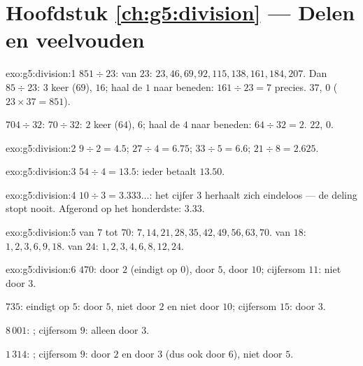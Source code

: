 \section*{Hoofdstuk \ref{ch:g5:division} --- Delen en veelvouden}

\begin{solution}{exo:g5:division:1}
$851 \div 23$:  van $23$: $23, 46, 69, 92, 115, 138, 161, 184,
207$. Dan $85 \div 23$: $3$ keer ($69$),  $16$; haal de $1$ naar beneden:
$161 \div 23 = 7$ precies.  $37$,  $0$ ($23 \times 37 = 851$).

$704 \div 32$: $70 \div 32$: $2$ keer ($64$),  $6$; haal de $4$ naar
beneden: $64 \div 32 = 2$.  $22$,  $0$.
\end{solution}

\begin{solution}{exo:g5:division:2}
$9 \div 2 = 4.5$; \quad $27 \div 4 = 6.75$; \quad
$33 \div 5 = 6.6$; \quad $21 \div 8 = 2.625$.
\end{solution}

\begin{solution}{exo:g5:division:3}
$54 \div 4 = 13.5$: ieder betaalt $13.50$.
\end{solution}

\begin{solution}{exo:g5:division:4}
$10 \div 3 = 3.333\dots$: het cijfer $3$ herhaalt zich eindeloos --- de
deling stopt nooit. Afgerond op het honderdste: $3.33$.
\end{solution}

\begin{solution}{exo:g5:division:5}
 van $7$ tot $70$: $7, 14, 21, 28, 35, 42, 49, 56, 63, 70$. 
van $18$: $1, 2, 3, 6, 9, 18$.  van $24$: $1, 2, 3, 4, 6, 8, 12, 24$.
\end{solution}

\begin{solution}{exo:g5:division:6}
$470$: door $2$ (eindigt op $0$), door $5$, door $10$; cijfersom $11$: niet
door $3$.

$735$: eindigt op $5$: door $5$, niet door $2$ en niet door $10$; cijfersom
$15$: door $3$.

$8\,001$: ; cijfersom $9$: alleen door $3$.

$1\,314$: ; cijfersom $9$: door $2$ en door $3$ (dus ook door $6$), niet
door $5$.
\end{solution}


